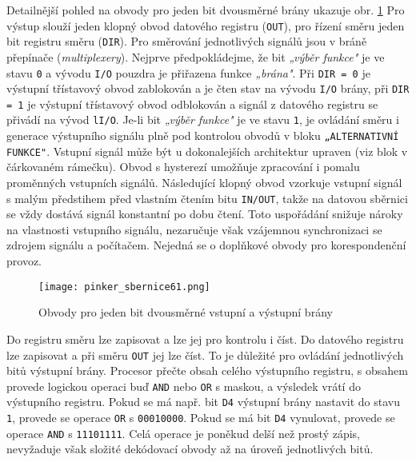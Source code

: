       Detailnější pohled na obvody pro jeden bit dvousměrné brány ukazuje obr.
      \ref{MIT:fig_sbernice61} Pro výstup slouží jeden klopný obvod datového registru
      (\texttt{OUT}), pro řízení směru jeden bit registru směru (\texttt{DIR}). Pro směrování
      jednotlivých signálů jsou v bráně přepínače (\emph{multiplexery}). Nejprve předpokládejme, že
      bit \emph{„výběr funkce"} je ve stavu \texttt{0} a vývodu \texttt{I/O} pouzdra je přiřazena
      funkce \emph{„brána"}. Při \texttt{DIR = 0} je výstupní třístavový obvod zablokován a je čten
      stav na vývodu \texttt{I/O} brány, při \texttt{DIR = 1} je výstupní třístavový obvod
      odblokován a signál z datového registru se přivádí na vývod \texttt{lI/O}. Je-li bit
      \emph{„výběr funkce"} je ve stavu \texttt{1}, je ovládání směru i generace výstupního signálu
      plně pod kontrolou obvodů v bloku \texttt{„ALTERNATIVNÍ FUNKCE"}. Vstupní signál může být u
      dokonalejších architektur upraven (viz blok v čárkovaném rámečku). Obvod s hysterezí umožňuje
      zpracování i pomalu proměnných vstupních signálů. Následující klopný obvod vzorkuje vstupní
      signál s malým předstihem před vlastním čtením bitu \texttt{IN/OUT}, takže na datovou sběrnici
      se vždy dostává signál konstantní po dobu čtení. Toto uspořádání snižuje nároky na vlastnosti
      vstupního signálu, nezaručuje však vzájemnou synchronizaci se zdrojem signálu a počítačem.
      Nejedná se o doplňkové obvody pro korespondenční provoz.

      \begin{figure}[ht!] %
        \centering
        \texttt{[image: pinker\_sbernice61.png]}
        \caption{Obvody pro jeden bit dvousměrné vstupní a výstupní brány}
        \label{MIT:fig_sbernice61}
      \end{figure}
      
      Do registru směru lze zapisovat a lze jej pro kontrolu i číst. Do datového registru lze
      zapisovat a při směru \texttt{OUT} jej lze číst. To je důležité pro ovládání jednotlivých bitů
      výstupní brány. Procesor přečte obsah celého výstupního registru, s obsahem provede logickou
      operaci buď \texttt{AND} nebo \texttt{OR} s maskou, a výsledek vrátí do výstupního registru.
      Pokud se má např. bit \texttt{D4} výstupní brány nastavit do stavu \texttt{1}, provede se
      operace \texttt{OR} s \texttt{00010000}. Pokud se má bit \texttt{D4} vynulovat, provede se
      operace \texttt{AND} s \texttt{11101111}. Celá operace je poněkud delší než prostý zápis,
      nevyžaduje však složité dekódovací obvody až na úroveň jednotlivých bitů.

